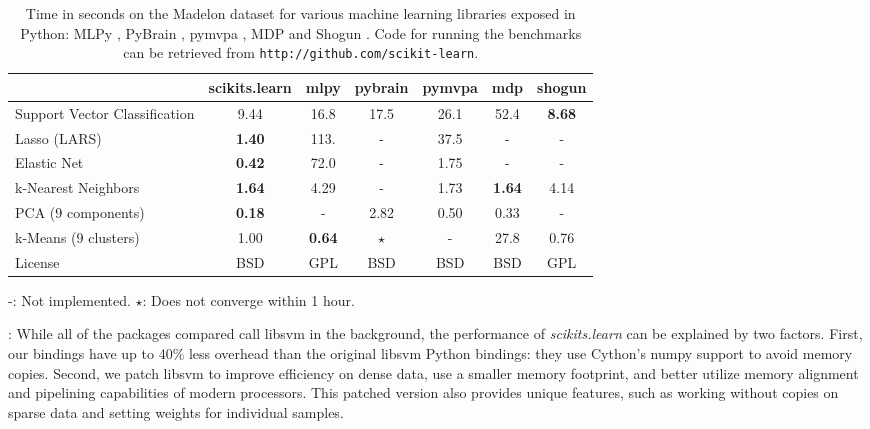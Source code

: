 \documentclass[twoside,11pt]{article}
\begin{document}
\begin{table}[t]
\small
\hspace*{.03\linewidth}%
\begin{tabular}{l c c c c c c}
\hline\hline %
 & scikits.learn & mlpy & pybrain & pymvpa &  mdp & shogun \\ [0.5ex]
\hline
Support Vector Classification & 9.44 & 16.8 & 17.5 & 26.1 & 52.4 & {\bf 8.68} \\
Lasso (LARS) & {\bf 1.40} & 113.   & - &  37.5 & - & - \\
Elastic Net & {\bf 0.42} & 72.0 & -  &  1.75  & -  & - \\
k-Nearest Neighbors & {\bf 1.64} & 4.29 & - &  1.73 & {\bf 1.64} & 4.14 \\
PCA (9 components) & {\bf 0.18} & - & 2.82  & 0.50 & 0.33  & - \\
k-Means (9 clusters) & 1.00 &  {\bf 0.64} & $\star$ & -  & 27.8 & 0.76 \\
License &  BSD & GPL & BSD  &  BSD  & BSD  & GPL \\
\hline
\end{tabular}

-: Not implemented. \hfill
$\star$: Does not converge within 1 hour.

\vspace*{-1.5ex}
\caption{\small
Time in seconds on the Madelon dataset for various machine learning libraries exposed in Python:
MLPy \citep{albanese2008}, PyBrain \citep{schaul2010}, pymvpa
\citep{hanke2009}, MDP \citep{zito2008} and Shogun
\citep{sonnenburg2010}. Code for running the
benchmarks can be retrieved from {\tt http://github.com/scikit-learn}.
\vspace*{-1.5em}\label{tab:comparisons}
}
\end{table}

\smallskip {}:
%
While all of the packages compared call libsvm in the
background, the
performance of \emph{scikits.learn} can be explained by two factors.
First, our bindings have up to 40\% less overhead than the original
libsvm Python bindings: they use Cython's numpy support
to avoid memory copies. Second, we patch libsvm to improve efficiency
on dense data, use a smaller memory footprint, and better utilize memory
alignment and pipelining capabilities of modern processors. This patched
version also provides unique features, such as working without copies on
sparse data and setting weights for individual samples.
\end{document}
